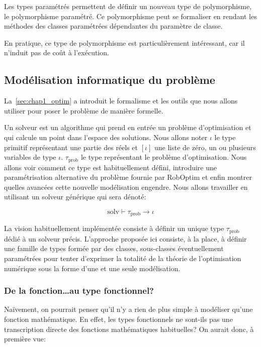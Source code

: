Les types paramétrés permettent de définir un nouveau type de
polymorphisme, le polymorphisme
paramétré. Ce
polymorphisme peut se formaliser en rendant les méthodes des classes
paramétrées dépendantes du paramètre de classe.

En pratique, ce type de polymorphisme est particulièrement
intéressant, car il n'induit pas de coût à l'exécution.


\subsection{Modélisation informatique du problème}
\label{sec:chap1_model2impl_typage_info}

La \autoref{sec:chap1_optim} a introduit le formalisme et les
outils que nous allons utiliser pour poser le problème de manière
formelle.


Un solveur est un algorithme qui prend en entrée un problème
d'optimisation et qui calcule un point dans l'espace des solutions.
Nous allons noter $\iota$ le type primitif représentant une partie des
réels et $[\iota]$ une liste de zéro, un ou plusieurs variables de
type $\iota$. $\tau_{\text{prob}}$ le type représentant le problème
d'optimisation. Nous allons voir comment ce type est habituellement
défini, introduire une paramétrisation alternative du problème fournie
par RobOptim et enfin montrer quelles avancées cette nouvelle
modélisation engendre.  Nous allons travailler en utilisant un solveur
générique qui sera dénoté:


\begin{equation}\label{eq:chap1_prob_type}
  \text{solv} \vdash \tau_{\text{prob}} \rightarrow \iota
\end{equation}


La vision habituellement implémentée consiste à définir un unique type
$\tau_{\text{prob}}$ dédié à un solveur précis. L'approche proposée
ici consiste, à la place, à définir une famille de types formée par
des classes, sous-classes éventuellement paramétrées pour tenter
d'exprimer la totalité de la théorie de l'optimisation numérique sous
la forme d'une et une seule modélisation.


\subsubsection{De la fonction\ldots au type fonctionnel?}
\label{sec:chap1_model2impl_typage_info_fct}


Naïvement, on pourrait penser qu'il n'y a rien de plus simple à
modéliser qu'une fonction mathématique. En effet, les types
fonctionnels ne sont-ils pas une transcription directe des fonctions
mathématiques habituelles? On aurait donc, à première vue:

